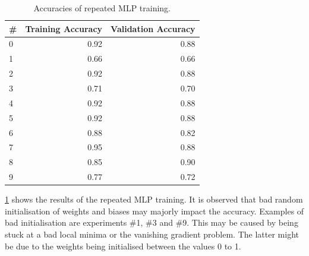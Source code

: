 \documentclass[10pt, twocolumn]{article}
\begin{document}
\begin{table}
    \centering
    \caption{Accuracies of repeated MLP training.}
    \label{tab:accs}
    \begin{tabular}{lrr}
    \toprule
    \# &  Training Accuracy &  Validation Accuracy \\
    \midrule
    0 &               0.92 &                 0.88 \\
    1 &               0.66 &                 0.66 \\
    2 &               0.92 &                 0.88 \\
    3 &               0.71 &                 0.70 \\
    4 &               0.92 &                 0.88 \\
    5 &               0.92 &                 0.88 \\
    6 &               0.88 &                 0.82 \\
    7 &               0.95 &                 0.88 \\
    8 &               0.85 &                 0.90 \\
    9 &               0.77 &                 0.72 \\
    \bottomrule
    \end{tabular}
\end{table}

\cref{tab:accs} shows the results of the repeated MLP training. It is observed that bad random initialisation of weights and biases may majorly impact the accuracy. Examples of bad initialisation are experiments \#1, \#3 and \#9. This may be caused by being stuck at a bad local minima or the vanishing gradient problem. The latter might be due to the weights being initialised between the values 0 to 1.
\end{document}
